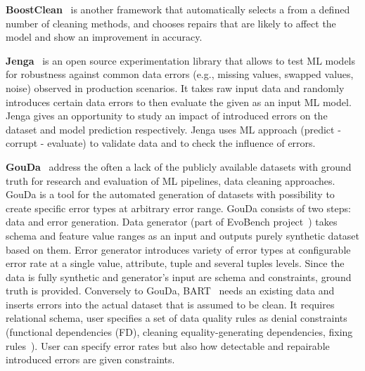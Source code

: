 \textbf{BoostClean}~\cite{boostclean} is another framework that automatically selects a from a defined number of cleaning methods, and chooses repairs that are likely to affect the model and show an improvement in accuracy. 


\textbf{Jenga}~\cite{jenga} is an open source experimentation library that allows to test ML models for robustness against common data errors (e.g., missing values, swapped values, noise) observed in production scenarios.
It takes raw input data and randomly introduces certain data errors to then evaluate the given as an input ML model.
Jenga gives an opportunity to study an impact of introduced errors on the dataset and model prediction respectively.
Jenga uses ML approach (predict - corrupt - evaluate) to validate data and to check the influence of errors.

\textbf{GouDa}~\cite{RestatGCS2022} address the often a lack of the publicly available datasets with ground truth for research and evaluation of ML pipelines, data cleaning approaches. 
GouDa is a tool for the automated generation of datasets with possibility to create specific error types at arbitrary error range.
GouDa consists of two steps: data and error generation.
Data generator (part of EvoBench project~\cite{evobench}) takes schema and feature value ranges as an input and outputs purely synthetic dataset based on them. 
Error generator introduces variety of error types at configurable error rate at a single value, attribute, tuple and several tuples levels.
Since the data is fully synthetic and generator's input are schema and constraints, ground truth is provided. 
Conversely to GouDa, BART~\cite{bart} needs an existing data and inserts errors into the actual dataset that is assumed to be clean. It requires relational schema, user specifies
a set of data quality rules as denial constraints~\cite{denialconst} (functional dependencies (FD), cleaning equality-generating dependencies, fixing rules~\cite{fixingrules}). 
User can specify error rates but also how detectable and repairable introduced errors are given constraints.

